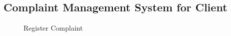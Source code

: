 \subsection{Complaint Management System for Client}
\begin{figure}[H]
	\begin{center}
		\caption{Register Complaint}
		\label{fig:cpm_register_user}
	\end{center}
\end{figure}
